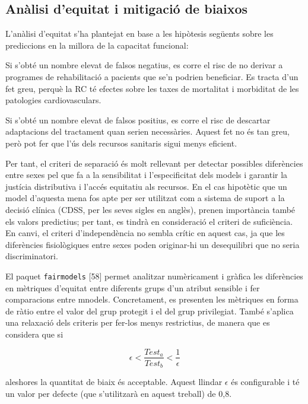\documentclass[CAT]{TFUOC}%
\begin{document}
\subsection{Anàlisi d'equitat i mitigació de biaixos}\label{anuxe0lisi-dequitat-i-mitigaciuxf3-de-biaixos}

L'anàlisi d'equitat s'ha plantejat en base a les hipòtesis següents sobre les prediccions en la millora de la capacitat funcional:

\bigskip

Si s'obté un nombre elevat de falsos negatius, es corre el risc de no derivar a programes de rehabilitació a pacients que se'n podrien beneficiar. Es tracta d'un fet greu, perquè la RC té efectes sobre les taxes de mortalitat i morbiditat de les patologies cardiovasculars.

Si s'obté un nombre elevat de falsos positius, es corre el risc de descartar adaptacions del tractament quan serien necessàries. Aquest fet no és tan greu, però pot fer que l'ús dels recursos sanitaris sigui menys eficient.

\bigskip

Per tant, el criteri de separació és molt rellevant per detectar possibles diferències entre sexes pel que fa a la sensibilitat i l'especificitat dels models i garantir la justícia distributiva i l'accés equitatiu als recursos. En el cas hipotètic que un model d'aquesta mena fos apte per ser utilitzat com a sistema de suport a la decisió clínica (CDSS, per les seves sigles en anglès), prenen importància també els valors predictius; per tant, es tindrà en consideració el criteri de suficiència. En canvi, el criteri d'independència no sembla crític en aquest cas, ja que les diferències fisiològiques entre sexes poden originar-hi un desequilibri que no seria discriminatori.

El paquet \texttt{fairmodels} {[}58{]} permet analitzar numèricament i gràfica les diferències en mètriques d'equitat entre diferents grups d'un atribut sensible i fer comparacions entre mnodels. Concretament, es presenten les mètriques en forma de ràtio entre el valor del grup protegit i el del grup privilegiat. També s'aplica una relaxació dels criteris per fer-los menys restrictius, de manera que es considera que si

\begin{equation}
\epsilon < \frac{Test_a}{Test_b} < \frac{1}{\epsilon}
\end{equation}

aleshores la quantitat de biaix és acceptable. Aquest llindar \(\epsilon\) és configurable i té un valor per defecte (que s'utilitzarà en aquest treball) de 0,8.
\end{document}
